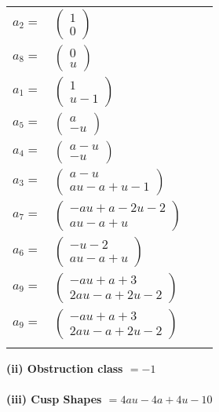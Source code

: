 \documentclass[1p]{elsarticle_modified}
\theoremstyle{definition}
\begin{document}
\begin{tabular}{m{7pt} m{180pt} m{7pt} m{180pt} }
\flushright $a_{2}=$&$\begin{pmatrix}1\\0\end{pmatrix}$ \\
\flushright $a_{8}=$&$\begin{pmatrix}0\\u\end{pmatrix}$ \\
\flushright $a_{1}=$&$\begin{pmatrix}1\\u-1\end{pmatrix}$ \\
\flushright $a_{5}=$&$\begin{pmatrix}a\\- u\end{pmatrix}$ \\
\flushright $a_{4}=$&$\begin{pmatrix}a- u\\- u\end{pmatrix}$ \\
\flushright $a_{3}=$&$\begin{pmatrix}a- u\\a u- a+u-1\end{pmatrix}$ \\
\flushright $a_{7}=$&$\begin{pmatrix}- a u+a-2 u-2\\a u- a+u\end{pmatrix}$ \\
\flushright $a_{6}=$&$\begin{pmatrix}- u-2\\a u- a+u\end{pmatrix}$ \\
\flushright $a_{9}=$&$\begin{pmatrix}- a u+a+3\\2 a u- a+2 u-2\end{pmatrix}$\\ \flushright $a_{9}=$&$\begin{pmatrix}- a u+a+3\\2 a u- a+2 u-2\end{pmatrix}$\\&\end{tabular}
\flushleft \textbf{(ii) Obstruction class $= -1$}\\~\\
\flushleft \textbf{(iii) Cusp Shapes $= 4 a u-4 a+4 u-10$}\\~\\
\end{document}
